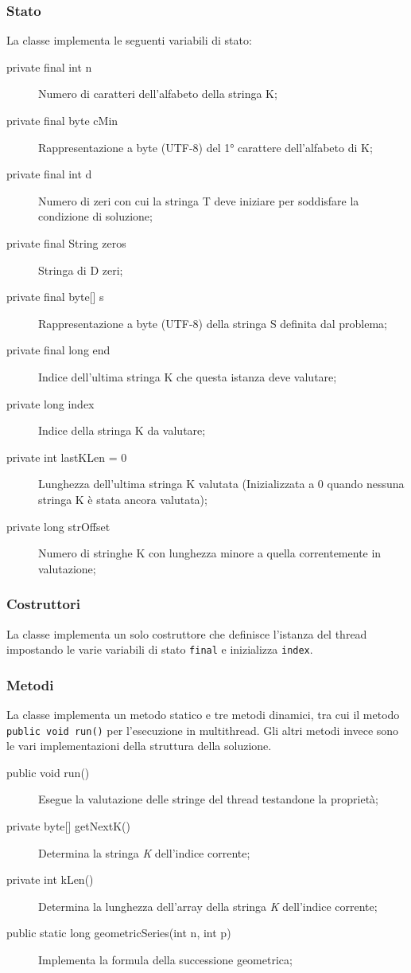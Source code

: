 \documentclass{article}
\begin{document}
    \subsubsection{Stato}
    La classe implementa le seguenti variabili di stato:
    \begin{description}
        \item[private final int n] Numero di caratteri dell'alfabeto della stringa K;
        \item[private final byte cMin] Rappresentazione a byte (UTF-8) del 1° carattere dell'alfabeto di K;
        \item[private final int d] Numero di zeri con cui la stringa T deve iniziare per soddisfare la condizione di soluzione;
        \item[private final String zeros] Stringa di D zeri;
        \item[{private final byte[] s}] Rappresentazione a byte (UTF-8) della stringa S definita dal problema;
        \item[private final long end] Indice dell'ultima stringa K che questa istanza deve valutare;
        \item[private long index] Indice della stringa K da valutare;
        \item[private int lastKLen = 0] Lunghezza dell'ultima stringa K valutata (Inizializzata a 0 quando nessuna stringa K è stata ancora valutata);
        \item[private long strOffset] Numero di stringhe K con lunghezza minore a quella correntemente in valutazione;
     \end{description}

     \subsubsection{Costruttori}
     La classe implementa un solo costruttore che definisce l'istanza del thread impostando le varie variabili di stato \verb|final| e inizializza \verb|index|.
     \newpage %

     \subsubsection{Metodi}
     La classe implementa un metodo statico e tre metodi dinamici, tra cui il metodo \verb|public void run()| per l'esecuzione in multithread. Gli altri metodi invece sono le vari implementazioni della struttura della soluzione.
     \begin{description}
        \item[public void run()] Esegue la valutazione delle stringe del thread testandone la proprietà;
        \item[{private byte[] getNextK()}] Determina la stringa \textit{K} dell'indice corrente;
        \item[private int kLen()] Determina la lunghezza dell'array della stringa \textit{K} dell'indice corrente;
        \item[public static long geometricSeries(int n, int p)] Implementa la formula della successione geometrica;
     \end{description}
     
\end{document}
